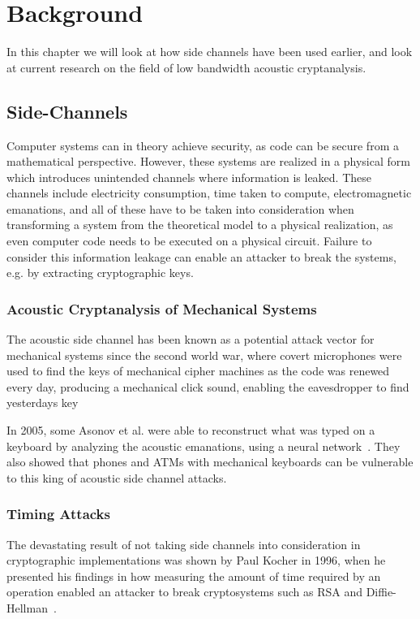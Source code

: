\chapter{Background}\label{chp:background} 
In this chapter we will look at how side channels have been used earlier, and look at current research on the field of low bandwidth acoustic cryptanalysis.


\section{Side-Channels}\label{chp2:sec:side_channel}
Computer systems can in theory achieve security, as code can be secure from a mathematical perspective.
However, these systems are realized in a physical form which introduces unintended channels where information is leaked.
These channels include electricity consumption, time taken to compute, electromagnetic emanations, and all of these have to be taken into consideration when transforming a system from the theoretical model to a physical realization, as even computer code needs to be executed on a physical circuit.
Failure to consider this information leakage can enable an attacker to break the systems, e.g. by extracting cryptographic keys.

\subsection{Acoustic Cryptanalysis of Mechanical Systems}\label{chp2:subsec:acoustic_cryptanalysis}
The acoustic side channel has been known as a potential attack vector for mechanical systems since the second world war, where covert microphones were used to find the keys of mechanical cipher machines as the code was renewed every day, producing a mechanical click sound, enabling the eavesdropper to find yesterdays key

In 2005, some Asonov et al. were able to reconstruct what was typed on a keyboard by analyzing the acoustic emanations, using a neural network~\cite{DBLP:conf/sp/AsonovA04}. 
They also showed that phones and ATMs with mechanical keyboards can be vulnerable to this king of acoustic side channel attacks.

\subsection{Timing Attacks}\label{chp2:subsec:timing_attacks}
The devastating result of not taking side channels into consideration in cryptographic implementations was shown by Paul Kocher in 1996, when he presented his findings in how measuring the amount of time required by an operation enabled an attacker to break cryptosystems such as RSA and Diffie-Hellman~\cite{DBLP:conf/crypto/Kocher96}.

